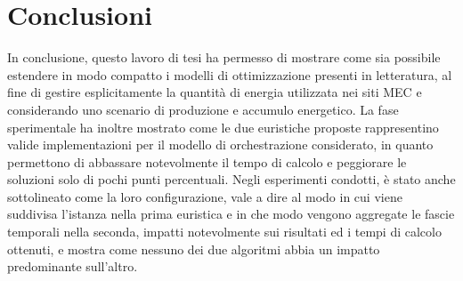 \chapter{Conclusioni}
\label{cap:conclusioni}

In conclusione, questo lavoro di tesi ha permesso di mostrare come sia possibile estendere in modo compatto i modelli di ottimizzazione presenti in letteratura, al fine di gestire esplicitamente la quantità di energia utilizzata nei siti MEC e considerando uno scenario di produzione e accumulo energetico. La fase sperimentale ha inoltre mostrato come le due euristiche proposte rappresentino valide implementazioni per il modello di orchestrazione considerato, in quanto permettono di abbassare notevolmente il tempo di calcolo e peggiorare le soluzioni solo di pochi punti percentuali. Negli esperimenti condotti, è stato anche sottolineato come la loro configurazione, vale a dire al modo in cui viene suddivisa l'istanza nella prima euristica e in che modo vengono aggregate le fascie temporali nella seconda, impatti notevolmente sui risultati ed i tempi di calcolo ottenuti, e mostra come nessuno dei due algoritmi abbia un impatto predominante sull'altro.
